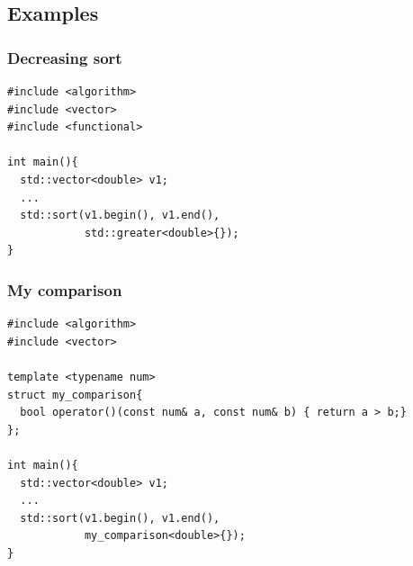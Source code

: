 \subsection{Examples}
\begin{frame}[fragile]
  \frametitle{Decreasing sort}
\begin{lstlisting}
#include <algorithm>
#include <vector>
#include <functional>
  
int main(){
  std::vector<double> v1;
  ...
  std::sort(v1.begin(), v1.end(),
            std::greater<double>{});
}
\end{lstlisting}
\end{frame}

\begin{frame}[fragile]
  \frametitle{My comparison}
\begin{lstlisting}
#include <algorithm>
#include <vector>
  
template <typename num>
struct my_comparison{
  bool operator()(const num& a, const num& b) { return a > b;}
};
  
int main(){
  std::vector<double> v1;
  ...
  std::sort(v1.begin(), v1.end(),
            my_comparison<double>{});
}
\end{lstlisting}
\end{frame}
